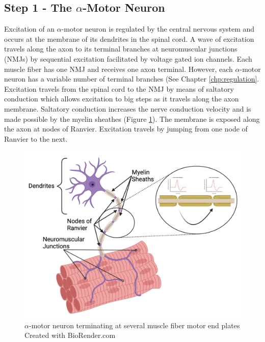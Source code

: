 \subsection{Step 1 - The $\alpha$-Motor Neuron}
Excitation of an $\alpha$-motor neuron is regulated by the central nervous system and occurs at the membrane of its dendrites in the spinal cord. A wave of excitation travels along the axon to its terminal branches at neuromuscular junctions (NMJs) by sequential excitation facilitated by voltage gated ion channels. Each muscle fiber has one NMJ and receives one axon terminal. However, each $\alpha$-motor neuron has a variable number of terminal branches (See Chapter \ref{chp:regulation}.  Excitation travels from the spinal cord to the NMJ by means of saltatory conduction which allows excitation to big steps as it travels along the axon membrane. Saltatory conduction increases the nerve conduction velocity and is made possible by the myelin sheathes (Figure \ref{fig:Motoneuron}). The membrane is exposed along the axon at nodes of Ranvier. Excitation travels by jumping from one node of Ranvier to the next.\footnotemark{} 

\begin{figure}[!ht]
    \centering
    \includegraphics[width=1\linewidth]{./figure/Motoneuron.png}
    \caption{$\alpha$-motor neuron terminating at several muscle fiber motor end plates \footnotesize{Created with BioRender.com}}
    \label{fig:Motoneuron}
\end{figure}

